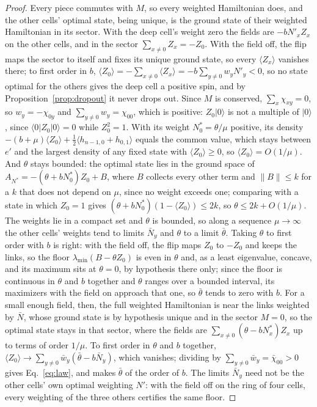 \documentclass[aps,prd,reprint,superscriptaddress]{revtex4-2}
\begin{document}
\begin{proof}
Every piece commutes with $M$, so every weighted Hamiltonian does, and the other cells' optimal state, being unique, is the ground state of their weighted Hamiltonian in its sector. With the deep cell's weight zero the fields are $-bN'_x Z_x$ on the other cells, and in the sector $\sum_{x\neq0} Z_x = -Z_0$. With the field off, the flip maps the sector to itself and fixes its unique ground state, so every $\langle Z_x\rangle$ vanishes there; to first order in $b$, $\langle Z_0\rangle = -\sum_{x\neq0}\langle Z_x\rangle = -b\sum_{y\neq0} w_y N'_y < 0$, so no state optimal for the others gives the deep cell a positive spin, and by Proposition~\ref{prop:dropout} it never drops out. Since $M$ is conserved, $\sum_x \chi_{xy} = 0$, so $w_y = -\chi_{0y}$ and $\sum_{y\neq0} w_y = \chi_{00}$, which is positive: $Z_0|0\rangle$ is not a multiple of $|0\rangle$, since $\langle 0|Z_0|0\rangle = 0$ while $Z_0^2 = 1$. With its weight $N^*_0 = \theta/\mu$ positive, its density $-(b + \mu)\langle Z_0\rangle + \tfrac12\langle h_{n-1,0} + h_{0,1}\rangle$ equals the common value, which stays between $e'$ and the largest density of any fixed state with $\langle Z_0\rangle \ge 0$, so $\langle Z_0\rangle = O(1/\mu)$. And $\theta$ stays bounded: the optimal state lies in the ground space of $A_{N^*} = -(\theta + bN^*_0) Z_0 + B$, where $B$ collects every other term and $\|B\| \le k$ for a $k$ that does not depend on $\mu$, since no weight exceeds one; comparing with a state in which $Z_0 = 1$ gives $(\theta + bN^*_0)(1 - \langle Z_0\rangle) \le 2k$, so $\theta \le 2k + O(1/\mu)$. The weights lie in a compact set and $\theta$ is bounded, so along a sequence $\mu \to \infty$ the other cells' weights tend to limits $\bar N_y$ and $\theta$ to a limit $\bar\theta$. Taking $\theta$ to first order with $b$ is right: with the field off, the flip maps $Z_0$ to $-Z_0$ and keeps the links, so the floor $\lambda_{\min}(B - \theta Z_0)$ is even in $\theta$ and, as a least eigenvalue, concave, and its maximum sits at $\theta = 0$, by hypothesis there only; since the floor is continuous in $\theta$ and $b$ together and $\theta$ ranges over a bounded interval, its maximizers with the field on approach that one, so $\bar\theta$ tends to zero with $b$. For a small enough field, then, the full weighted Hamiltonian is near the links weighted by $\bar N$, whose ground state is by hypothesis unique and in the sector $M = 0$, so the optimal state stays in that sector, where the fields are $\sum_{x\neq0}(\theta - bN^*_x) Z_x$ up to terms of order $1/\mu$. To first order in $\theta$ and $b$ together, $\langle Z_0\rangle \to \sum_{y\neq0} \bar w_y(\bar\theta - b\bar N_y)$, which vanishes; dividing by $\sum_{y\neq0}\bar w_y = \bar\chi_{00} > 0$ gives Eq.~\eqref{eq:law}, and makes $\bar\theta$ of the order of $b$. The limits $\bar N_y$ need not be the other cells' own optimal weighting $N'$: with the field off on the ring of four cells, every weighting of the three others certifies the same floor.
\end{proof}
\end{document}
